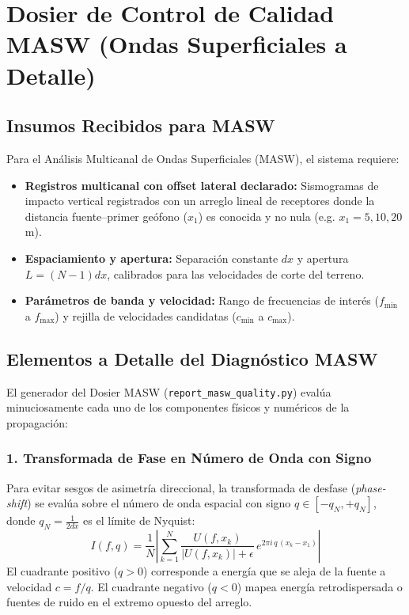 \documentclass[11pt,a4paper]{article}
\begin{document}
\newpage
\section{Dosier de Control de Calidad MASW (Ondas Superficiales a Detalle)}

\subsection{Insumos Recibidos para MASW}
Para el Análisis Multicanal de Ondas Superficiales (MASW), el sistema requiere:
\begin{itemize}
    \item \textbf{Registros multicanal con offset lateral declarado:} Sismogramas de impacto vertical registrados con un arreglo lineal de receptores donde la distancia fuente--primer geófono ($x_1$) es conocida y no nula (e.g. $x_1 = 5, 10, 20$\,m).
    \item \textbf{Espaciamiento y apertura:} Separación constante $dx$ y apertura $L = (N-1)dx$, calibrados para las velocidades de corte del terreno.
    \item \textbf{Parámetros de banda y velocidad:} Rango de frecuencias de interés ($f_{\min}$ a $f_{\max}$) y rejilla de velocidades candidatas ($c_{\min}$ a $c_{\max}$).
\end{itemize}

\subsection{Elementos a Detalle del Diagnóstico MASW}
El generador del Dosier MASW (\texttt{report\_masw\_quality.py}) evalúa minuciosamente cada uno de los componentes físicos y numéricos de la propagación:

\subsubsection{1. Transformada de Fase en Número de Onda con Signo}
Para evitar sesgos de asimetría direccional, la transformada de desfase (\emph{phase-shift}) se evalúa sobre el número de onda espacial con signo $q \in [-q_N, +q_N]$, donde $q_N = \frac{1}{2 dx}$ es el límite de Nyquist:
\begin{equation}
    I(f, q) = \frac{1}{N} \left| \sum_{k=1}^{N} \frac{U(f, x_k)}{|U(f, x_k)| + \epsilon} \, e^{2\pi i \, q \, (x_k - x_1)} \right|
\end{equation}
El cuadrante positivo ($q > 0$) corresponde a energía que se aleja de la fuente a velocidad $c = f/q$. El cuadrante negativo ($q < 0$) mapea energía retrodispersada o fuentes de ruido en el extremo opuesto del arreglo.
\end{document}
